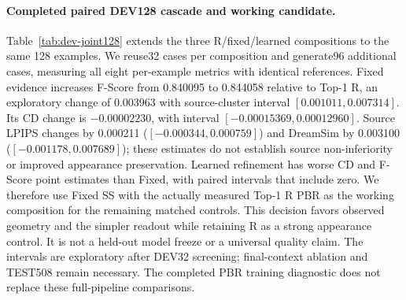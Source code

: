 \documentclass[10pt]{article}
\begin{document}
\paragraph{Completed paired DEV128 cascade and working candidate.}
Table~\ref{tab:dev-joint128} extends the three R/fixed/learned compositions
to the same 128 examples. We reuse32 cases per composition and generate96
additional cases, measuring all eight per-example metrics with identical
references. Fixed evidence increases F-Score from 0.840095 to 0.844058
relative to Top-1 R, an exploratory change of 0.003963 with source-cluster
interval $[0.001011,0.007314]$. Its CD change is $-0.00002230$, with interval
$[-0.00015369,0.00012960]$. Source LPIPS changes by 0.000211
($[-0.000344,0.000759]$) and DreamSim by 0.003100
($[-0.001178,0.007689]$); these estimates do not establish source
non-inferiority or improved appearance preservation.
Learned refinement has worse CD and F-Score point estimates than Fixed,
with paired intervals that include zero. We therefore use Fixed SS with
the actually measured Top-1 R PBR as the working composition for the remaining
matched controls. This decision favors observed
geometry and the simpler readout while retaining R as a strong appearance
control. It is not a held-out model freeze or a universal quality claim.
The intervals are exploratory after DEV32 screening; final-context
ablation and TEST508 remain necessary. The completed PBR training diagnostic
does not replace these full-pipeline comparisons.

\end{document}
